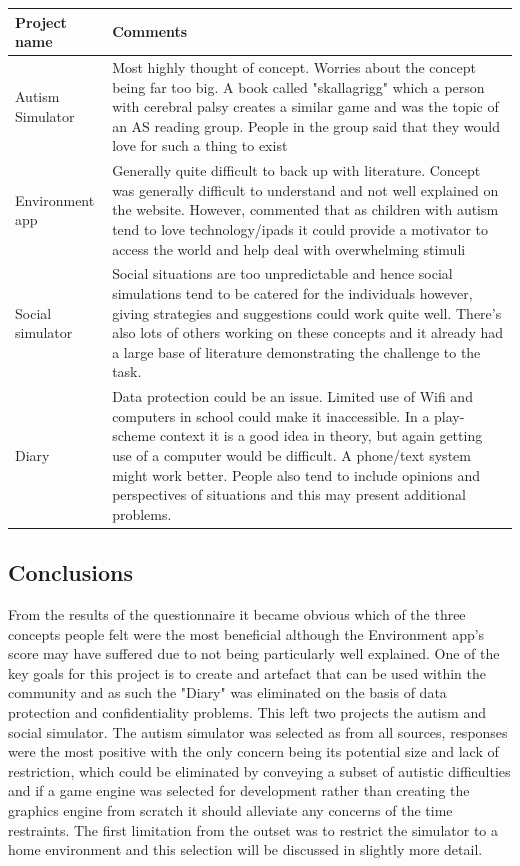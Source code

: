 \documentclass[11pt]{report}
\begin{document}
\begin{table}[H]
    \begin{tabular}{| p{3cm} | p{12cm} |}
    \hline
    Project name & Comments \\ \hline
    Autism Simulator & Most highly thought of concept. Worries about the concept being far too big. A book called "skallagrigg" which a person with cerebral palsy creates a similar game and was the topic of an AS reading group. People in the group said that they would love for such a thing to exist\\ \hline
    Environment app & Generally quite difficult to back up with literature. Concept was generally difficult to understand and not well explained on the website. However, commented that as children with autism tend to love technology/ipads it could provide a motivator to access the world and help deal with overwhelming stimuli\\ \hline
    Social simulator & Social situations are too unpredictable and hence social simulations tend to be catered for the individuals however, giving strategies and suggestions could work quite well. There's also lots of others working on these concepts and it already had a large base of literature demonstrating the challenge to the task. \\ \hline
    Diary & Data protection could be an issue. Limited use of Wifi and computers in school could make it inaccessible. In a play-scheme context it is a good idea in theory, but again getting use of a computer would be difficult. A phone/text system might work better. People also tend to include opinions and perspectives of situations and this may present additional problems. \\ \hline
    \end{tabular}
\end{table}

\subsection{Conclusions}
From the results of the questionnaire it became obvious which of the three concepts people felt were the most beneficial although the Environment app's score may have suffered due to not being particularly well explained. One of the key goals for this project is to create and artefact that can be used within the community and as such the "Diary" was eliminated on the basis of data protection and confidentiality problems. This left two projects the autism and social simulator. The autism simulator was selected as from all sources, responses were the most positive with the only concern being its potential size and lack of restriction, which could be eliminated by conveying a subset of autistic difficulties and if a game engine was selected for development rather than creating the graphics engine from scratch it should alleviate any concerns of the time restraints. The first limitation from the outset was to restrict the simulator to a home environment and this selection will be discussed in slightly more detail. 
\end{document}
